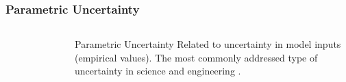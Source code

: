 \begin{frame}
    \frametitle{Parametric Uncertainty}
    \begin{columns}
        \column[t]{4cm}
        \begin{figure}
            \centering
        \end{figure}

        \column[t]{6cm}
        \begin{block}{Parametric Uncertainty}
            Related to uncertainty in model inputs (empirical values). The most
            commonly addressed type of uncertainty in science and engineering
            \cite{yue_review_2018,decarolis_using_2011,morgan_uncertainty_1990}.    
        \end{block}
        
    \end{columns}

\end{frame}

